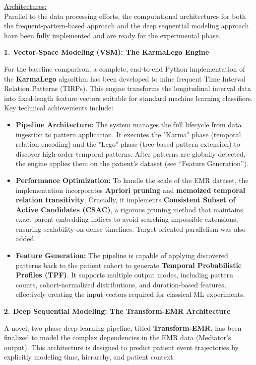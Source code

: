 \documentclass[
]{article}
\begin{document}
\ul{Architectures:\\
}Parallel to the data processing efforts, the computational
architectures for both the frequent-pattern-based approach and the deep
sequential modeling approach have been fully implemented and are ready
for the experimental phase.

\textbf{1. Vector-Space Modeling (VSM): The KarmaLego Engine}

For the baseline comparison, a complete, end-to-end Python
implementation of the \textbf{KarmaLego} algorithm has been developed to
mine frequent Time Interval Relation Patterns (TIRPs). This engine
transforms the longitudinal interval data into fixed-length feature
vectors suitable for standard machine learning classifiers. Key
technical achievements include:

\begin{itemize}
\item
  \textbf{Pipeline Architecture:} The system manages the full lifecycle
  from data ingestion to pattern application. It executes the "Karma"
  phase (temporal relation encoding) and the "Lego" phase (tree-based
  pattern extension) to discover high-order temporal patterns. After
  patterns are globally detected, the engine applies them on the
  patient's dataset (see ``Feature Generation'').
\item
  \textbf{Performance Optimization:} To handle the scale of the EMR
  dataset, the implementation incorporates \textbf{Apriori pruning} and
  \textbf{memoized temporal relation transitivity}. Crucially, it
  implements \textbf{Consistent Subset of Active Candidates (CSAC)}, a
  rigorous pruning method that maintains exact parent embedding indices
  to avoid searching impossible extensions, ensuring scalability on
  dense timelines. Target oriented parallelism was also added.
\item
  \textbf{Feature Generation:} The pipeline is capable of applying
  discovered patterns back to the patient cohort to generate
  \textbf{Temporal Probabilistic Profiles (TPF)}. It supports multiple
  output modes, including pattern counts, cohort-normalized
  distributions, and duration-based features, effectively creating the
  input vectors required for classical ML experiments.
\end{itemize}

\textbf{2. Deep Sequential Modeling: The Transform-EMR Architecture}

A novel, two-phase deep learning pipeline, titled
\textbf{Transform-EMR}, has been finalized to model the complex
dependencies in the EMR data (Mediator's output). This architecture is
designed to predict patient event trajectories by explicitly modeling
time, hierarchy, and patient context.
\end{document}
